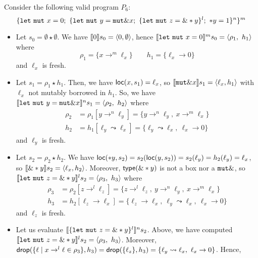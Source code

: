 \begin{example}\label{ex:program-reborrow-valid}
  Consider the following valid program $P_6$:
  \[
    \{
      \mathtt{let\ mut}\ x = 0;\
      \{
        \mathtt{let\ mut}\ y = \mathtt{mut}\borrow x;\
        \{
          \mathtt{let\ mut}\ z = \borrow*y
        \}^l;\
        *y = 1
      \}^n
    \}^m
  \]
  \begin{itemize}
    \item Let $s_0=\emptyset \star \emptyset$.
    We have $\den[0]{s_0} = \langle 0,\emptyset\rangle$, hence
    $\denl[\mathtt{let\ mut}\ x = 0]{m}{s_0} =
    \langle \rho_1,\ h_1\rangle$ where
    \[\rho_1=\{x\to^m\ell_x\} \qquad
    h_1 = \{\ell_x\to 0\}\]
    and $\ell_x$ is fresh.
    \item Let $s_1 = \rho_1 \star h_1$.
    Then, we have $\loc(x,s_1) = \ell_x$, so
    $\den[\mathtt{mut}\borrow x]{s_1} = \langle\ell_x, h_1\rangle$
    with $\ell_x$ not mutably borrowed in $h_1$.
    So, we have
    $\denl[\mathtt{let\ mut}\ y = \mathtt{mut}\borrow x]{n}{s_1} =
    \langle \rho_2,\ h_2\rangle$
    where
    \begin{align*}
      \rho_2 & = \rho_1[y\to^n\ell_y] = \{y\to^n\ell_y,\ x\to^m\ell_x\}\\
      h_2 & = h_1[\ell_y\leadsto \ell_x] =
      \{\ell_y\leadsto \ell_x,\ \ell_x\to 0\}
    \end{align*}
    and $\ell_y$ is fresh.
    \item Let $s_2 = \rho_2 \star h_2$.
    We have $\loc(*y,s_2) = s_2(\loc(y,s_2)) = s_2(\ell_y) = h_2(\ell_y) = \ell_x$,
    so $\den[\borrow*y]{s_2} = \langle \ell_x,h_2\rangle$.
    Moreover, $\type(\borrow*y)$ is not a box nor a $\mathtt{mut}\borrow$, so
    $\denl[\mathtt{let\ mut}\ z = \borrow*y]{l}{s_2} =
    \langle \rho_3,\ h_3\rangle$
    where
    \begin{align*}
      \rho_3 & = \rho_2[z\to^l\ell_z] = \{z\to^l\ell_z,\ y\to^n\ell_y,\ x\to^m\ell_x\}\\
      h_3 & = h_2[\ell_z\to \ell_x] =
      \{\ell_z\to \ell_x,\ \ell_y\leadsto \ell_x,\ \ell_x\to 0\}
    \end{align*}
    and $\ell_z$ is fresh.
    \item Let us evaluate $\denl[\{\mathtt{let\ mut}\ z = \borrow*y\}^l]{n}{s_2}$.
    Above, we have computed $\denl[\mathtt{let\ mut}\ z = \borrow*y]{l}{s_2} =
    \langle \rho_3,\ h_3\rangle$. Moreover,
    $\drop(\{\ell\mid x\to^l\ell\in\rho_3\},h_3) = \drop(\{\ell_z\},h_3) =
    \{\ell_y\leadsto \ell_x,\ \ell_x\to 0\}$. Hence,

\end{itemize}
\end{example}
